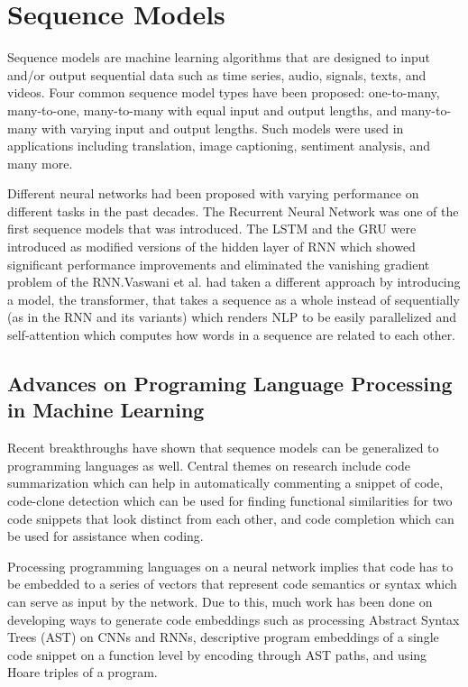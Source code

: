 \section{Sequence Models}

Sequence models are machine learning algorithms that are designed to input and/or 
output sequential data such as time series, audio, signals, texts, and videos. 
Four common sequence model types have been proposed: one-to-many, many-to-one, 
many-to-many with equal input and output lengths, and many-to-many with varying 
input and output lengths. Such models were used in applications including translation, 
image captioning, sentiment analysis, and many more\cite{yousuf2021systematic}. 

Different neural networks had been proposed with varying performance on different 
tasks in the past decades. The Recurrent Neural Network\cite{hinton1986learning} was one of 
the first sequence models that was introduced. The LSTM\cite{hochreiter1997long} 
and the GRU\cite{chung2014empirical} were introduced as modified versions of the hidden layer 
of RNN which showed significant performance improvements and eliminated the vanishing 
gradient problem of the RNN.\@ Vaswani et al.\cite{vaswani2017attention} had taken a different 
approach by introducing a model, the transformer, that takes a sequence as a whole 
instead of sequentially (as in the RNN and its variants) which renders NLP to be 
easily parallelized and self-attention which computes how words in a sequence are 
related to each other.

\subsection{Advances on Programing Language Processing in Machine Learning}

Recent breakthroughs have shown that sequence models can be generalized to 
programming languages as well. Central themes on research include code summarization\cite{xie2021exploiting} 
which can help in automatically commenting a snippet of code, 
code-clone detection\cite{wei2017supervised} which can be used for finding functional 
similarities for two code snippets that look distinct from each other, and code 
completion\cite{alon2020structural} which can be used for assistance when coding.

Processing programming languages on a neural network implies that code has 
to be embedded to a series of vectors that represent code semantics or 
syntax which can serve as input by the network. Due to this, much work 
has been done on developing ways to generate code embeddings such as 
processing Abstract Syntax Trees (AST) on CNNs and RNNs,\cite{mou2016convolutional}\cite{chen2019capturing}
descriptive program embeddings of a single code snippet on a function 
level\cite{alon2019code2vec} by encoding through AST paths\cite{alon2018code2seq}, 
and  using Hoare triples of a program\cite{piech2015learning}. 